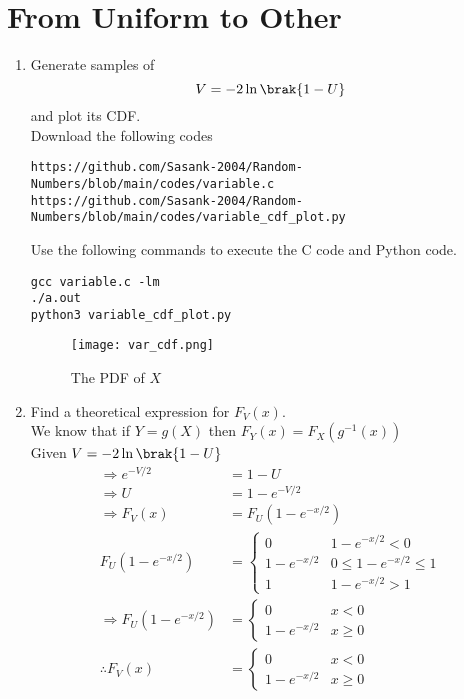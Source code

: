\documentclass[journal,12pt,twocolumn]{IEEEtran}
\renewcommand\thesection{\arabic{section}}
\begin{document}
\section{From Uniform to Other}
\begin{enumerate}[label=\thesection.\arabic*
,ref=\thesection.\theenumi]
%
\item
Generate samples of 
%
\begin{equation}
V = -2\ln\brak{1-U}
\end{equation}
%
and plot its CDF.  \\
\solution Download the following codes
\begin{lstlisting}
https://github.com/Sasank-2004/Random-Numbers/blob/main/codes/variable.c
https://github.com/Sasank-2004/Random-Numbers/blob/main/codes/variable_cdf_plot.py
\end{lstlisting}
Use the following commands to execute the C code and Python code.
\begin{lstlisting}
gcc variable.c -lm
./a.out
python3 variable_cdf_plot.py
\end{lstlisting}
\begin{figure}[h]
\centering
\texttt{[image: var\_cdf.png]}
\caption{The PDF of $X$}
\label{fig:var_cdf}
\end{figure}
\item Find a theoretical expression for $F_V(x)$.\\
\solution We know that if $Y=g(X)$ then $F_Y(x) = F_X(g^{-1}(x))$ \\
Given $V = -2\ln\brak{1-U}$
\begin{align}
    \Rightarrow e^{-V/2} &= 1 -U \\
    \Rightarrow U &= 1 - e^{-V/2} \\
    \Rightarrow F_V(x) &= F_U(1-e^{-x/2}) \\
    F_U(1-e^{-x/2}) &= 
    \begin{cases}
    0 &   1-e^{-x/2} < 0 \\
    1-e^{-x/2} &  0 \le 1-e^{-x/2} \le 1 \\
    1 &  1-e^{-x/2} > 1
    \end{cases} \\
    \Rightarrow  F_U(1-e^{-x/2}) &= 
    \begin{cases}
    0 & x < 0 \\
    1-e^{-x/2} & x \ge 0 
    \end{cases}\\
    \therefore F_V(x) &= 
    \begin{cases}
    0 & x < 0 \\
    1-e^{-x/2} & x \ge 0 
    \end{cases}
\end{align}


%
\end{enumerate}
\end{document}
